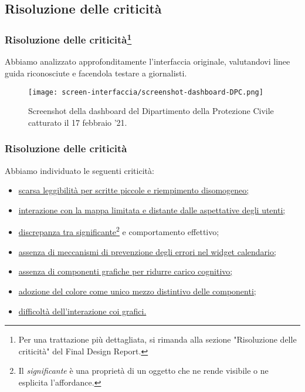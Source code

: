 \subsection{Risoluzione delle criticità}


\begin{frame}
    \frametitle{Risoluzione delle criticità\footnote{Per una trattazione più dettagliata, si rimanda alla sezione "Risoluzione delle criticità" del Final Design Report.}}
    Abbiamo analizzato approfonditamente l'interfaccia originale, valutandovi linee guida riconosciute e facendola testare a giornalisti. 
    \begin{figure}
        \centering
        \texttt{[image: screen-interfaccia/screenshot-dashboard-DPC.png]}
        \caption{Screenshot della dashboard del Dipartimento della Protezione Civile catturato il 17 febbraio '21.}
    \end{figure}
\end{frame}

\begin{frame}
    \frametitle{Risoluzione delle criticità}
    Abbiamo individuato le seguenti criticità: 
    \begin{itemize}
        \item<1-> \hyperlink{f:scarsa-leggibilita}{scarsa leggibilità per scritte piccole e riempimento disomogeneo;}        
        \item<2-> \hyperlink{f:mappa}{interazione con la mappa limitata e distante dalle aspettative degli utenti;}
        \item<3-> \hyperlink{f:significante}{discrepanza tra significante\footnote{Il \textit{significante} è una proprietà di un oggetto che ne rende visibile o ne esplicita l'affordance.} e comportamento effettivo;}
        \item<4-> \hyperlink{f:errori}{assenza di meccanismi di prevenzione degli errori nel widget calendario;}
        \item<5-> \hyperlink{f:grafica}{assenza di componenti grafiche per ridurre carico cognitivo;}
        \item<6-> \hyperlink{f:colore}{adozione del colore come unico mezzo distintivo delle componenti;}
        \item<7-> \hyperlink{f:difficolta}{difficoltà dell'interazione coi grafici.}
    \end{itemize}    

\end{frame}


